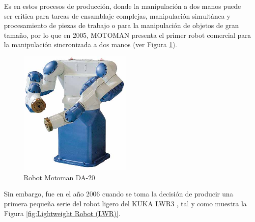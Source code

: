   
Es en estos procesos de producción, donde la manipulación a dos manos puede ser crítica para tareas de ensamblaje complejas, manipulación simultánea
y procesamiento de piezas de trabajo o para la manipulación de objetos de gran tamaño, por lo que en 2005, MOTOMAN presenta el primer robot comercial para la manipulación sincronizada a dos manos \cite{Siciliano16} (ver Figura \ref{fig:MOTOMAN}).\\

  \begin{figure} [H]
    \begin{center}
      \includegraphics[width=55mm]{figs/MOTOMAN.jpg}
    \end{center}
    \caption{Robot Motoman DA-20}
    \label{fig:MOTOMAN}
  \end{figure}
  
Sin embargo, fue en el año 2006 %
cuando se toma la decisión de producir una primera pequeña serie del robot ligero del KUKA LWR3 \cite{Bischoff10}, tal y como muestra la Figura \ref{fig:Lightweight Robot (LWR)}.
  
